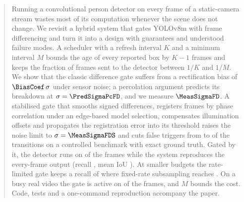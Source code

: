 \begin{abstract}
Running a convolutional person detector on every frame of a static-camera stream wastes most of its computation whenever the scene does not change. We revisit a hybrid system that gates YOLOv8m with frame differencing and turn it into a design with guarantees and understood failure modes. A scheduler with a refresh interval $K$ and a minimum interval $M$ bounds the age of every reported box by $K-1$ frames and keeps the fraction of frames sent to the detector between $1/K$ and $1/M$. We show that the classic difference gate suffers from a rectification bias of $\BiasCoef\,\sigma$ under sensor noise; a percolation argument predicts its breakdown at $\sigma=\PredSigmaPcFD$, and we measure $\MeasSigmaFD$. A stabilised gate that smooths signed differences, registers frames by phase correlation under an edge-based model selection, compensates illumination offsets and propagates the registration error into its threshold raises the noise limit to $\sigma=\MeasSigmaFDS$ and cuts false triggers from \GateFprFD{} to \GateFprFDS{} of the transitions on a controlled benchmark with exact ground truth. Gated by it, the detector runs on \PolRatioFDS{} of the frames while the system reproduces the every-frame output (recall \PolRecallFDS, mean IoU \PolIouFDS). At smaller budgets the rate-limited gate keeps a recall of \PolRecallFDSMFour{} where fixed-rate subsampling reaches \FixedRecallAtFDSMFour. On a busy real video the gate is active on \VtActiveFDS{} of the frames, and $M$ bounds the cost. Code, tests and a one-command reproduction accompany the paper.
\end{abstract}
\printkeywords
